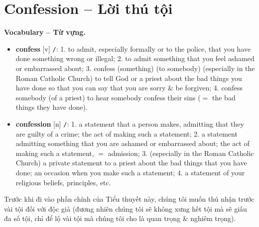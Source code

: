 \documentclass[12pt,twoside]{book}
\begin{document}

\section{Confession -- Lời thú tội}
\textbf{\textsf{\small Vocabulary -- Từ vựng.}}
\begin{itemize}\small\sf
	\item \textbf{confess} [v] {\tt/}: 1. to admit, especially formally or to the police, that you have done something wrong or illegal; 2. to admit something that you feel ashamed or embarrassed about; 3. {confess (something) (to somebody)} (especially in the Roman Catholic Church) to tell God or a priest about the bad things you have done so that you can say that you are sorry \& be forgiven; 4. {\sf confess somebody} (of a priest) to hear somebody confess their sins ($=$ the bad things they have done).
	\item \textbf{confession} [n] {\tt/}: 1. a statement that a person makes, admitting that they are guilty of a crime; the act of making such a statement; 2. a statement admitting something that you are ashamed or embarrassed about; the act of making such a statement, $=$ {\sf admission}; 3. (especially in the Roman Catholic Church) a private statement to a priest about the bad things that you have done; an occasion when you make such a statement; 4. a statement of your religious beliefs, principles, etc.
\end{itemize}
Trước khi đi vào phần chính của Tiểu thuyết này, chúng tôi muốn thú nhận trước vài tội đối với độc giả (đương nhiên chúng tôi sẽ không xưng hết tội mà sẽ giấu đa số tội, chỉ để lộ vài tội mà chúng tôi cho là quan trọng \& nghiêm trọng).
\end{document}
